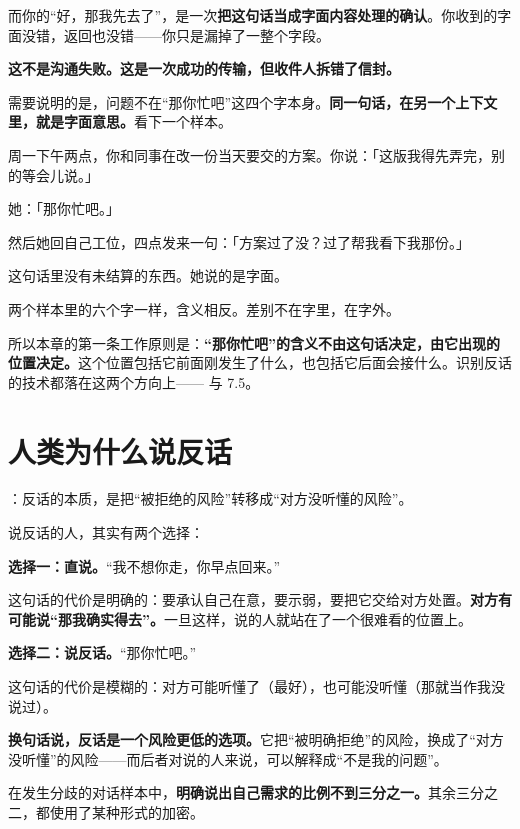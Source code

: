 而你的“好，那我先去了”，是一次\textbf{把这句话当成字面内容处理的确认}。你收到的字面没错，返回也没错——你只是漏掉了一整个字段。

\textbf{这不是沟通失败。这是一次成功的传输，但收件人拆错了信封。}

需要说明的是，问题不在“那你忙吧”这四个字本身。\textbf{同一句话，在另一个上下文里，就是字面意思。}看下一个样本。

\par
\begin{mdquote}
周一下午两点，你和同事在改一份当天要交的方案。你说：「这版我得先弄完，别的等会儿说。」\par
她：「那你忙吧。」\par
然后她回自己工位，四点发来一句：「方案过了没？过了帮我看下我那份。」\par
\vspace{0.3\baselineskip}
这句话里没有未结算的东西。她说的是字面。
\end{mdquote}

两个样本里的六个字一样，含义相反。差别不在字里，在字外。

所以本章的第一条工作原则是：\textbf{“那你忙吧”的含义不由这句话决定，由它出现的位置决定。}这个位置包括它前面刚发生了什么，也包括它后面会接什么。识别反话的技术都落在这两个方向上—— 与 7.5。

\section{人类为什么说反话}

：反话的本质，是把“被拒绝的风险”转移成“对方没听懂的风险”。

说反话的人，其实有两个选择：

\textbf{选择一：直说。}“我不想你走，你早点回来。”

这句话的代价是明确的：要承认自己在意，要示弱，要把它交给对方处置。\textbf{对方有可能说“那我确实得去”。}一旦这样，说的人就站在了一个很难看的位置上。

\textbf{选择二：说反话。}“那你忙吧。”

这句话的代价是模糊的：对方可能听懂了（最好），也可能没听懂（那就当作我没说过）。

\textbf{换句话说，反话是一个风险更低的选项。}它把“被明确拒绝”的风险，换成了“对方没听懂”的风险——而后者对说的人来说，可以解释成“不是我的问题”。

在发生分歧的对话样本中，\textbf{明确说出自己需求的比例不到三分之一。}其余三分之二，都使用了某种形式的加密。

